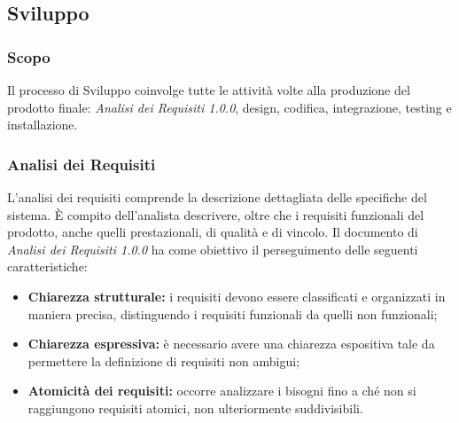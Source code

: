 \subsection{Sviluppo}
\subsubsection{Scopo}
Il processo di Sviluppo coinvolge tutte le attività volte alla produzione del prodotto finale: \textit{Analisi dei Requisiti 1.0.0\docs},  design, codifica, integrazione, testing e installazione.
\subsubsection{Analisi dei Requisiti}
L'analisi dei requisiti comprende la descrizione dettagliata delle specifiche del sistema. È compito dell'analista descrivere, oltre che i requisiti funzionali del prodotto, anche quelli prestazionali, di qualità e di vincolo. 
Il documento di \textit{Analisi dei Requisiti 1.0.0\doc} ha come obiettivo il perseguimento delle seguenti caratteristiche:
\begin{itemize}
	\item \textbf{Chiarezza strutturale:} i requisiti devono essere classificati e organizzati in maniera precisa, distinguendo i requisiti funzionali da quelli non funzionali;
	\item \textbf{Chiarezza espressiva:} è necessario avere una chiarezza espositiva tale da permettere la definizione di requisiti non ambigui;
	\item \textbf{Atomicità dei requisiti:} occorre analizzare i bisogni fino a ché non si raggiungono requisiti atomici, non ulteriormente suddivisibili.  
\end{itemize}

